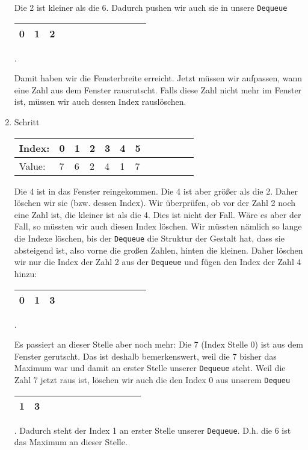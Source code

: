 \documentclass[babel]{book}
\begin{document}
\begin{enumerate}
	Die 2 ist kleiner als die 6. Dadurch pushen wir auch sie in unsere \lstinline|Dequeue|
	\begin{tabular}{|l|l|l|l|l|l|l|l|l|l|l|l|} 
		\hline
		0 & 1 & 2\\
		\hline
	\end{tabular}.

Damit haben wir die Fensterbreite erreicht. Jetzt müssen wir aufpassen, wann eine Zahl aus dem Fenster rausrutscht. Falls diese Zahl nicht mehr im Fenster ist, müssen wir auch dessen Index rauslöschen.
	
	\item Schritt
	
	\begin{tabular}{|l|l|l|l|l|l|l|l|l|l|l|l|} 
		\hline
		Index: & 0 & \cellcolor{yellow!25}1 & \cellcolor{yellow!25}2 & \cellcolor{yellow!25}3 & 4 & 5\\ 
		\hline
		Value: & 7 & \cellcolor{blue!25}6 & \cellcolor{blue!25}2 & \cellcolor{blue!25}4 & 1 & 7\\
		\hline
	\end{tabular}
	Die 4 ist in das Fenster reingekommen. Die 4 ist aber größer als die 2. Daher löschen wir sie (bzw. dessen Index). Wir überprüfen, ob vor der Zahl 2 noch eine Zahl ist, die kleiner ist als die 4. Dies ist nicht der Fall. Wäre es aber der Fall, so müssten wir auch diesen Index löschen. Wir müssten nämlich so lange die Indexe löschen, bis der \lstinline|Dequeue| die Struktur der Gestalt hat, dass sie absteigend ist, also vorne die großen Zahlen, hinten die kleinen. Daher löschen wir nur die Index der Zahl 2 aus der \lstinline|Dequeue| und fügen den Index der Zahl 4 hinzu: 
	
	\begin{tabular}{|l|l|l|l|l|l|l|l|l|l|l|l|} 
		\hline
		0 & 1 & 3\\
		\hline
	\end{tabular}.
	
	Es passiert an dieser Stelle aber noch mehr: Die 7 (Index Stelle 0) ist aus dem Fenster gerutscht. Das ist deshalb bemerkenswert, weil die 7 bisher das Maximum war und damit an erster Stelle unserer \lstinline|Dequeue| steht. Weil die Zahl 7 jetzt raus ist, löschen wir auch die den Index 0 aus unserem \lstinline|Dequeu|
		\begin{tabular}{|l|l|l|l|l|l|l|l|l|l|l|l|} 
		\hline
		1 & 3\\
		\hline
	\end{tabular}.
	Dadurch steht der Index 1 an erster Stelle unserer \lstinline|Dequeue|. D.h. die 6 ist das Maximum an dieser Stelle.
\end{enumerate}
\end{document}
